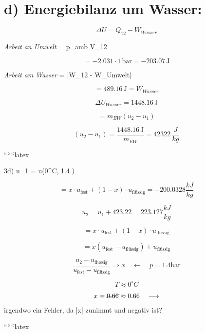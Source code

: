 \section*{d) Energiebilanz um Wasser:}

\[
\Delta U = Q_{12} - W_{Wasser}
\]

\textit{Arbeit an Umwelt} = p_{amb} \cdot \Delta V_{12}

\[
= -2.031 \cdot 1 \, \text{bar} = -203.07 \, \text{J}
\]

\textit{Arbeit am Wasser} = |W_{12} - W_{Umwelt}|

\[
= 489.16 \, \text{J} = W_{Wasser}
\]

\[
\Delta U_{Wasser} = 1448.16 \, \text{J}
\]

\[
= m_{EW} (u_2 - u_1)
\]

\[
(u_2 - u_1) = \frac{1448.16 \, \text{J}}{m_{EW}} = 42322 \, \frac{J}{kg}
\]

``````latex

3d) \quad u_1 = u(0^\circ C, 1.4 ) \Rightarrow

\[
= x \cdot u_{\text{fest}} + (1-x) \cdot u_{\text{flüssig}} = -200.0328 \frac{kJ}{kg}
\]

\[
u_2 = u_1 + 423.22 = 223.127 \frac{kJ}{kg}
\]

\[
= x \cdot u_{\text{fest}} + (1-x) \cdot u_{\text{flüssig}}
\]

\[
= x \left( u_{\text{fest}} - u_{\text{flüssig}} \right) + u_{\text{flüssig}}
\]

\[
\frac{u_2 - u_{\text{flüssig}}}{u_{\text{fest}} - u_{\text{flüssig}}} \Rightarrow x \quad \longleftarrow \quad p = 1.4 \text{bar}
\]

\[
T \approx 0^\circ C
\]

\[
x = \cancel{0.66} \approx 0.66 \quad \longrightarrow
\]

irgendwo ein Fehler, da |x| zunimmt und negativ ist?

``````latex